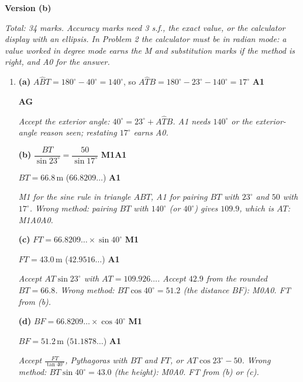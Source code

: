 \documentclass[12pt, twoside]{article}
\begin{document}
\newpage

\textbf{\large Version (b)}

\emph{Total: 34 marks. Accuracy marks need 3 s.f., the exact value, or the
calculator display with an ellipsis. In Problem 2 the calculator must be in
radian mode: a value worked in degree mode earns the M and substitution
marks if the method is right, and A0 for the answer.}

\begin{enumerate}[itemsep=0.3cm]

\item[1.] [Maximum mark: 8]

\textbf{(a)} $A\hat{B}T = 180^\circ - 40^\circ = 140^\circ$, so
$A\hat{T}B = 180^\circ - 23^\circ - 140^\circ = 17^\circ$ \hfill \textbf{A1}

\hfill \textbf{AG}

\emph{Accept the exterior angle: $40^\circ = 23^\circ + A\hat{T}B$. A1 needs
$140^\circ$ or the exterior-angle reason seen; restating $17^\circ$ earns
A0.}

\textbf{(b)} $\dfrac{BT}{\sin 23^\circ} = \dfrac{50}{\sin 17^\circ}$ \hfill \textbf{M1A1}

$BT = 66.8\,\text{m}$ \quad ($66.8209\ldots$) \hfill \textbf{A1}

\emph{M1 for the sine rule in triangle $ABT$, A1 for pairing $BT$ with
$23^\circ$ and $50$ with $17^\circ$. Wrong method: pairing $BT$ with
$140^\circ$ (or $40^\circ$) gives $109.9$, which is $AT$: M1A0A0.}

\textbf{(c)} $FT = 66.8209\ldots \times \sin 40^\circ$ \hfill \textbf{M1}

$FT = 43.0\,\text{m}$ \quad ($42.9516\ldots$) \hfill \textbf{A1}

\emph{Accept $AT\sin 23^\circ$ with $AT = 109.926\ldots$. Accept $42.9$
from the rounded $BT = 66.8$. Wrong method: $BT\cos 40^\circ = 51.2$ (the
distance $BF$): M0A0. FT from (b).}

\textbf{(d)} $BF = 66.8209\ldots \times \cos 40^\circ$ \hfill \textbf{M1}

$BF = 51.2\,\text{m}$ \quad ($51.1878\ldots$) \hfill \textbf{A1}

\emph{Accept $\frac{FT}{\tan 40^\circ}$, Pythagoras with $BT$ and $FT$, or
$AT\cos 23^\circ - 50$. Wrong method: $BT\sin 40^\circ = 43.0$ (the height):
M0A0. FT from (b) or (c).}

\newpage


\end{enumerate}
\end{document}
